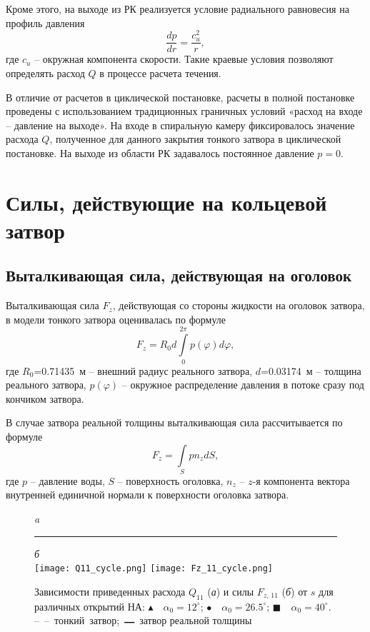 Кроме этого, на выходе из РК реализуется условие радиального равновесия на профиль давления 
\begin{equation*}
  \frac{dp}{dr}=\frac{c_u^2}{r},
\end{equation*}
где $c_u$ -- окружная компонента скорости. Такие краевые условия позволяют 
определять расход $Q$ в процессе расчета течения.

В отличие от расчетов в циклической постановке, расчеты в полной постановке проведены с использованием 
традиционных граничных условий «расход на входе -- давление на выходе». На входе в спиральную камеру 
фиксировалось значение расхода $Q$, полученное для данного закрытия тонкого затвора в циклической постановке. 
На выходе из области РК задавалось постоянное давление $p = 0$.

\section{Силы, действующие на кольцевой затвор}
\label{s:44}
\subsection{Выталкивающая сила, действующая на оголовок}
\label{s:441}
Выталкивающая сила $F_z$, действующая со стороны жидкости на оголовок затвора, в модели тонкого затвора 
оценивалась по формуле
\begin{equation}
  F_z = R_0 d\int\limits_0^{2\pi}{p(\varphi)d\varphi}, 
  \label{eq:5}
\end{equation}
где $R_0$=0.71435~м -- внешний радиус реального затвора, $d$=0.03174~м -- толщина реального затвора, 
$p(\varphi)$ -- окружное распределение давления в потоке сразу под кончиком затвора. 

В случае затвора реальной толщины выталкивающая сила рассчитывается по формуле
\begin{equation}
  F_z = \int\limits_S p n_z dS,
  \label{eq:6}
\end{equation}
где $p$ -- давление воды, $S$ -- поверхность оголовка, $n_z$ -- $z$-я компонента вектора внутренней единичной 
нормали к поверхности оголовка затвора.
\begin{figure}[!hb]
  \centering \small \emph{a}\rule{90mm}{0mm}\emph{б}\\[1.5mm]
  {\texttt{[image: Q11\_cycle.png]}}\hfill
  {\texttt{[image: Fz\_11\_cycle.png]}}\\  
  \caption{Зависимости приведенных расхода $Q_{11}$ (\emph{а}) и силы $F_{z,\, 11}$ (\emph{б}) от $s$ для
           различных открытий НА: $\blacktriangle$~~$\alpha_0=12^\circ$; $\bullet$~~$\alpha_0=26.5^\circ$; 
  $\blacksquare$~~$\alpha_0=40^\circ$. --~--~тонкий~затвор; $\genfrac{}{}{1pt}{2}{\quad}{  }$ затвор 
  реальной толщины}
  \label{fig:4}
\end{figure}


